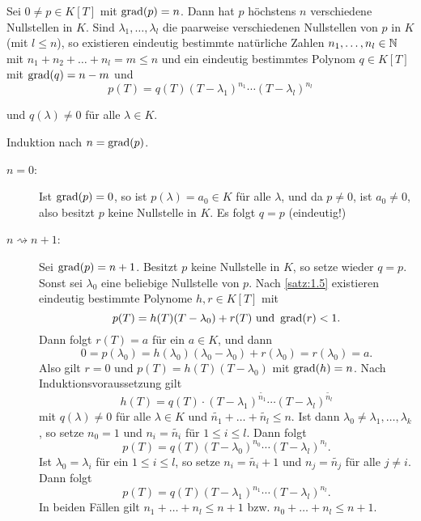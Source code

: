 \begin{satz}
	\label{satz:1.6}
	Sei $0 \neq p \in K[T]$ mit $\operatorname{grad}(p) = n$.
	Dann hat $p$ höchstens $n$ verschiedene Nullstellen in $K$.
	Sind $\lambda_1,\dots,\lambda_l$ die paarweise verschiedenen Nullstellen von $p$ in $K$ (mit $l \leq n$), so existieren eindeutig bestimmte natürliche Zahlen $n_1,\dots,n_l \in \mathbb{N}$ mit $n_1+n_2+\dots+n_l = m \leq n$ und ein eindeutig bestimmtes Polynom $q \in K[T]$ mit $\operatorname{grad}(q) = n-m$ und
	\begin{equation}
		p(T) = q(T)(T-\lambda_1)^{n_1} \cdots (T-\lambda_l)^{n_l} \label{eq:1.6.1}
	\end{equation}
		
	und $q(\lambda) \neq 0$ für alle $\lambda \in K$.
\end{satz}

\begin{beweis}
	Induktion nach $n = \operatorname{grad}(p)$.
	\begin{description}
		\item[$n=0$:] Ist $\operatorname{grad}(p) = 0$, so ist $p(\lambda) = a_0 \in K$ für alle $\lambda$, und da $p \neq 0$, ist $a_0 \neq 0$, also besitzt $p$ keine Nullstelle in $K$.
		Es folgt $q = p$ (eindeutig!)
		\item[$n \rightsquigarrow n+1$:] Sei $\operatorname{grad}(p) = n+1$.
		Besitzt $p$ keine Nullstelle in $K$, so setze wieder $q = p$.
		Sonst sei $\lambda_0$ eine beliebige Nullstelle von $p$.
		Nach \autoref{satz:1.5} existieren eindeutig bestimmte Polynome $h,r \in K[T]$ mit 
		\[
			p(T) = h(T)(T-\lambda_0) + r(T) \text{ und } \operatorname{grad}(r) < 1.
		\]
		Dann folgt $r(T) = a$ für ein $a \in K$, und dann
		\[
			0 = p(\lambda_0) = h(\lambda_0)(\lambda_0-\lambda_0) + r(\lambda_0) = r(\lambda_0) = a.
		\]
		Also gilt $r = 0$ und $p(T) = h(T)(T-\lambda_0)$ mit $\operatorname{grad}(h) = n$.
		Nach Induktionsvoraussetzung gilt
		\[
			h(T) = q(T)\cdot (T-\lambda_1)^{\widetilde{n_1}} \cdots (T-\lambda_l)^{\widetilde{n_l}}
		\]
		mit $q(\lambda) \neq 0$ für alle $\lambda \in K$ und $\widetilde{n_1} + \dots + \widetilde{n_l} \leq n$.
		Ist dann $\lambda_0 \neq \lambda_1,\dots,\lambda_k$, so setze $n_0 = 1$ und $n_i = \widetilde{n_i}$ für $1 \leq i \leq l$.
		Dann folgt
		\[
			p(T) = q(T)(T-\lambda_0)^{n_0} \cdots (T-\lambda_l)^{n_l}.
		\]
		Ist $\lambda_0 = \lambda_i$ für ein $1 \leq i \leq l$, so setze $n_i = \widetilde{n_i} + 1$ und $n_j = \widetilde{n_j}$ für alle $j \neq i$.
		Dann folgt
		\[
			p(T) = q(T)(T-\lambda_1)^{n_1} \cdots (T-\lambda_l)^{n_l}.
		\]
		In beiden Fällen gilt $n_1+\dots+n_l \leq n+1$ bzw. $n_0 + \dots + n_l \leq n+1$.
		

\end{description}
\end{beweis}
